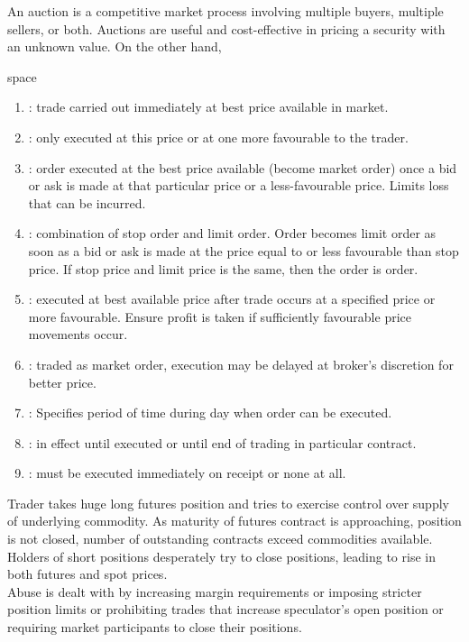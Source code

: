 An auction is a competitive market process involving multiple buyers, multiple sellers, or both. Auctions are useful and cost-effective in pricing a security with an unknown value. On the other hand, 

\begin{definition} {\color{white}space}
\begin{enumerate}[label=\roman*.]
\setlength{\itemsep}{0pt}
\item {}: trade carried out immediately at best price available in market.
\item {}: only executed at this price or at one more favourable to the trader.
\item {}: order executed at the best price available (become market order) once a bid or ask is made at that particular price or a less-favourable price. Limits loss that can be incurred.
\item {}: combination of stop order and limit order. Order becomes limit order as soon as a bid or ask is made at the price equal to or less favourable than stop price. If stop price and limit price is the same, then the order is  order.
\item {}: executed at best available price after trade occurs at a specified price or more favourable. Ensure profit is taken if sufficiently favourable price movements occur.
\item {}: traded as market order, execution may be delayed at broker's discretion for better price.
\item {}: Specifies period of time during day when order can be executed.
\item {}: in effect until executed or until end of trading in particular contract.
\item {}: must be executed immediately on receipt or none at all.
\end{enumerate}
\end{definition}

\begin{remark}
 Trader takes huge long futures position and tries to exercise control over supply of underlying commodity. As maturity of futures contract is approaching, position is not closed, number of outstanding contracts exceed commodities available. Holders of short positions desperately try to close positions, leading to rise in both futures and spot prices.\\
Abuse is dealt with by increasing margin requirements or imposing stricter position limits or prohibiting trades that increase speculator's open position or requiring market participants to close their positions.
\end{remark}
